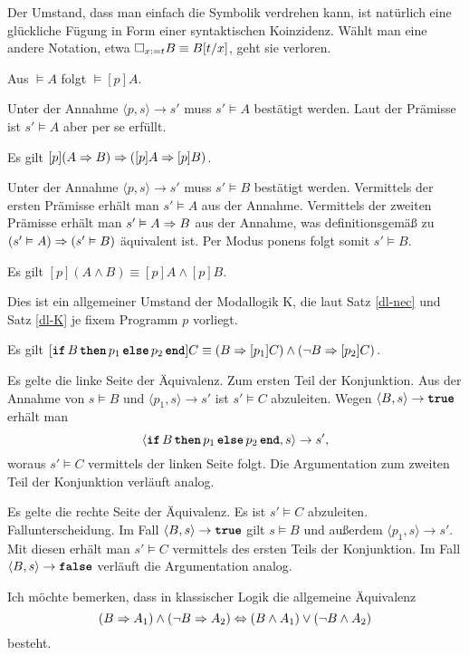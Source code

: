 Der Umstand, dass man einfach die Symbolik verdrehen kann, ist natürlich
eine glückliche Fügung in Form einer syntaktischen Koinzidenz. Wählt man
eine andere Notation, etwa $\Box_{x:=t} B\equiv B[t/x]$, geht sie verloren.

\begin{Satz}\label{dl-nec}
Aus $\models A$ folgt $\models [p]A$.
\end{Satz}
\begin{Beweis}
Unter der Annahme $\langle p,s\rangle\to s'$ muss $s'\models A$ bestätigt
werden. Laut der Prämisse ist $s'\models A$ aber per se erfüllt.\,\qedsymbol
\end{Beweis}

\begin{Satz}\label{dl-K}
Es gilt $[p](A\Rightarrow B)\Rightarrow ([p]A\Rightarrow [p]B)$.
\end{Satz}
\begin{Beweis}
Unter der Annahme $\langle p,s\rangle\to s'$ muss $s'\models B$ bestätigt
werden. Vermittels der ersten Prämisse erhält man $s'\models A$ aus
der Annahme. Vermittels der zweiten Prämisse erhält man
$s'\vDash A\Rightarrow B$ aus der Annahme, was definitionsgemäß zu
$(s'\vDash A)\Rightarrow (s'\vDash B)$ äquivalent ist. Per Modus ponens
folgt somit $s'\models B$.\,\qedsymbol
\end{Beweis}

\begin{Satz}
Es gilt $[p](A\land B)\equiv [p]A\land [p]B$.
\end{Satz}
\begin{Beweis}
Dies ist ein allgemeiner Umstand der Modallogik K, die
laut Satz \ref{dl-nec} und Satz \ref{dl-K} je fixem Programm $p$
vorliegt.\,\qedsymbol
\end{Beweis}

\begin{Satz}
Es gilt $[\kw{if}\,B\,\kw{then}\,p_1\,\kw{else}\,p_2\,\kw{end}]C\equiv
(B\cond [p_1]C)\land (\lnot B\cond [p_2]C)$.
\end{Satz}
\begin{Beweis}
Es gelte die linke Seite der Äquivalenz. Zum ersten Teil der Konjunktion.
Aus der Annahme von $s\models B$ und $\langle p_1,s\rangle\to s'$ ist
$s'\models C$ abzuleiten. Wegen $\langle B,s\rangle\to\kw{true}$ erhält man
\[\langle\kw{if}\,B\,\kw{then}\,p_1\,\kw{else}\,p_2\,\kw{end},s\rangle\to s',\]
woraus $s'\models C$ vermittels der linken Seite folgt. Die Argumentation
zum zweiten Teil der Konjunktion verläuft analog.

Es gelte die rechte Seite der Äquivalenz. Es ist $s'\models C$
abzuleiten. Fallunterscheidung. Im Fall $\langle B,s\rangle\to\kw{true}$
gilt $s\models B$ und außerdem $\langle p_1,s\rangle\to s'$. Mit
diesen erhält man $s'\models C$ vermittels des ersten Teils der
Konjunktion. Im Fall $\langle B,s\rangle\to\kw{false}$ verläuft
die Argumentation analog.\,\qedsymbol
\end{Beweis}

\noindent
Ich möchte bemerken, dass in klassischer Logik die allgemeine Äquivalenz
\[(B\Rightarrow A_1)\land (\lnot B\Rightarrow A_2)\Leftrightarrow
(B\land A_1)\lor (\lnot B\land A_2)\]
besteht.
